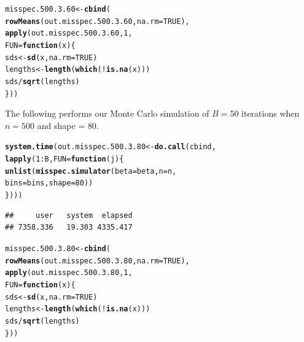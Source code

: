 \documentclass[11pt]{article}\usepackage[]{graphicx}\usepackage[]{color}
\makeatletter
\newcommand{\hlnum}[1]{\textcolor[rgb]{0.686,0.059,0.569}{#1}}%
\newcommand{\hlopt}[1]{\textcolor[rgb]{0,0,0}{#1}}%
\newcommand{\hlstd}[1]{\textcolor[rgb]{0.345,0.345,0.345}{#1}}%
\newcommand{\hlkwa}[1]{\textcolor[rgb]{0.161,0.373,0.58}{\textbf{#1}}}%
\newcommand{\hlkwb}[1]{\textcolor[rgb]{0.69,0.353,0.396}{#1}}%
\newcommand{\hlkwc}[1]{\textcolor[rgb]{0.333,0.667,0.333}{#1}}%
\newcommand{\hlkwd}[1]{\textcolor[rgb]{0.737,0.353,0.396}{\textbf{#1}}}%
\newenvironment{kframe}{%
 \def\at@end@of@kframe{}%
 \ifinner\ifhmode%
  \def\at@end@of@kframe{\end{minipage}}%
  \begin{minipage}{\columnwidth}%
 \fi\fi%
 \def\FrameCommand##1{\hskip\@totalleftmargin \hskip-\fboxsep
 \colorbox{shadecolor}{##1}\hskip-\fboxsep
     \hskip-\linewidth \hskip-\@totalleftmargin \hskip\columnwidth}%
 \MakeFramed {\advance\hsize-\width
   \@totalleftmargin\z@ \linewidth\hsize
   \@setminipage}}%
 {\par\unskip\endMakeFramed%
 \at@end@of@kframe}
\newenvironment{knitrout}{}{} %
\makeatother
\begin{document}
\begin{knitrout}
\color{fgcolor}\begin{kframe}
\begin{alltt}
\hlstd{misspec.500.3.60} \hlkwb{<-} \hlkwd{cbind}\hlstd{(}
  \hlkwd{rowMeans}\hlstd{(out.misspec.500.3.60,} \hlkwc{na.rm} \hlstd{=} \hlnum{TRUE}\hlstd{),}
  \hlkwd{apply}\hlstd{(out.misspec.500.3.60,} \hlnum{1}\hlstd{,}
  \hlkwc{FUN} \hlstd{=} \hlkwa{function}\hlstd{(}\hlkwc{x}\hlstd{)\{}
    \hlstd{sds} \hlkwb{<-} \hlkwd{sd}\hlstd{(x,} \hlkwc{na.rm} \hlstd{=} \hlnum{TRUE}\hlstd{)}
    \hlstd{lengths} \hlkwb{<-} \hlkwd{length}\hlstd{(}\hlkwd{which}\hlstd{(}\hlopt{!}\hlkwd{is.na}\hlstd{(x)))}
    \hlstd{sds} \hlopt{/} \hlkwd{sqrt}\hlstd{(lengths)}
  \hlstd{\}))}
\end{alltt}
\end{kframe}
\end{knitrout}

The following performs our Monte Carlo simulation of $B = 50$ iterations 
when $n = 500$ and shape = $80$.

\begin{knitrout}
\color{fgcolor}\begin{kframe}
\begin{alltt}
\hlkwd{system.time}\hlstd{(out.misspec.500.3.80} \hlkwb{<-} \hlkwd{do.call}\hlstd{(cbind,}
  \hlkwd{lapply}\hlstd{(}\hlnum{1}\hlopt{:}\hlstd{B,} \hlkwc{FUN} \hlstd{=} \hlkwa{function}\hlstd{(}\hlkwc{j}\hlstd{)\{}
    \hlkwd{unlist}\hlstd{(}\hlkwd{misspec.simulator}\hlstd{(}\hlkwc{beta} \hlstd{= beta,} \hlkwc{n} \hlstd{= n,}
      \hlkwc{bins} \hlstd{= bins,} \hlkwc{shape} \hlstd{=} \hlnum{80}\hlstd{))}
\hlstd{\})))}
\end{alltt}
\begin{verbatim}
##     user   system  elapsed 
## 7358.336   19.303 4335.417
\end{verbatim}
\end{kframe}
\end{knitrout}

\begin{knitrout}
\color{fgcolor}\begin{kframe}
\begin{alltt}
\hlstd{misspec.500.3.80} \hlkwb{<-} \hlkwd{cbind}\hlstd{(}
  \hlkwd{rowMeans}\hlstd{(out.misspec.500.3.80,} \hlkwc{na.rm} \hlstd{=} \hlnum{TRUE}\hlstd{),}
  \hlkwd{apply}\hlstd{(out.misspec.500.3.80,} \hlnum{1}\hlstd{,}
  \hlkwc{FUN} \hlstd{=} \hlkwa{function}\hlstd{(}\hlkwc{x}\hlstd{)\{}
    \hlstd{sds} \hlkwb{<-} \hlkwd{sd}\hlstd{(x,} \hlkwc{na.rm} \hlstd{=} \hlnum{TRUE}\hlstd{)}
    \hlstd{lengths} \hlkwb{<-} \hlkwd{length}\hlstd{(}\hlkwd{which}\hlstd{(}\hlopt{!}\hlkwd{is.na}\hlstd{(x)))}
    \hlstd{sds} \hlopt{/} \hlkwd{sqrt}\hlstd{(lengths)}
  \hlstd{\}))}
\end{alltt}
\end{kframe}
\end{knitrout}
\end{document}
